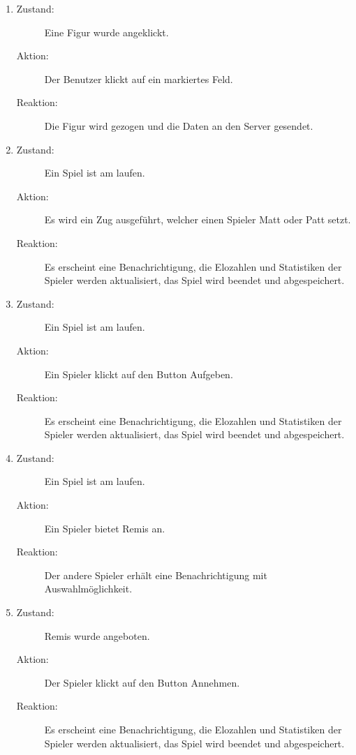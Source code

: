 \documentclass[parskip=full]{scrartcl}
\begin{document}
\begin{enumerate}
	
	\item
	\begin{description}
	\item[Zustand:] Eine Figur wurde angeklickt.
	\item[Aktion:] Der Benutzer klickt auf ein markiertes Feld.
	\item[Reaktion:] Die Figur wird gezogen und die Daten an den Server gesendet.  \\
	\end{description}
	
	\item
	\begin{description}
	\item[Zustand:] Ein Spiel ist am laufen.
	\item[Aktion:] Es wird ein Zug ausgeführt, welcher einen Spieler Matt oder Patt setzt.
	\item[Reaktion:] Es erscheint eine Benachrichtigung, die Elozahlen und Statistiken der Spieler werden aktualisiert, das Spiel wird beendet und abgespeichert.  \\
	\end{description}
	
	\item
	\begin{description}
	\item[Zustand:] Ein Spiel ist am laufen.
	\item[Aktion:] Ein Spieler klickt auf den Button \glqq Aufgeben\grqq.
	\item[Reaktion:] Es erscheint eine Benachrichtigung, die Elozahlen und Statistiken der Spieler werden aktualisiert, das Spiel wird beendet und abgespeichert.  \\
	\end{description}
	
	\item
	\begin{description}
	\item[Zustand:] Ein Spiel ist am laufen.
	\item[Aktion:] Ein Spieler bietet Remis an.
	\item[Reaktion:] Der andere Spieler erhält eine Benachrichtigung mit Auswahlmöglichkeit.  \\
	\end{description}
	
	\item
	\begin{description}
	\item[Zustand:] Remis wurde angeboten.
	\item[Aktion:] Der Spieler klickt auf den Button \glqq Annehmen\grqq.
	\item[Reaktion:] Es erscheint eine Benachrichtigung, die Elozahlen und Statistiken der Spieler werden aktualisiert, das Spiel wird beendet und abgespeichert.  \\
	\end{description}
	

\end{enumerate}
\end{document}
